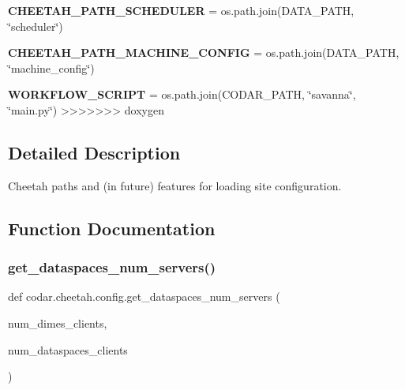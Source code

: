 \begin{DoxyCompactItemize}
{\bfseries C\+H\+E\+E\+T\+A\+H\+\_\+\+P\+A\+T\+H\+\_\+\+S\+C\+H\+E\+D\+U\+L\+ER} = os.\+path.\+join(D\+A\+T\+A\+\_\+\+P\+A\+TH, \char`\"{}scheduler\char`\"{})
\item 
\mbox{\label{namespacecodar_1_1cheetah_1_1config_a5d735d6f2f43c555f2e137b38af7fc94}} 
{\bfseries C\+H\+E\+E\+T\+A\+H\+\_\+\+P\+A\+T\+H\+\_\+\+M\+A\+C\+H\+I\+N\+E\+\_\+\+C\+O\+N\+F\+IG} = os.\+path.\+join(D\+A\+T\+A\+\_\+\+P\+A\+TH, \char`\"{}machine\+\_\+config\char`\"{})
\item 
\mbox{\label{namespacecodar_1_1cheetah_1_1config_a069e6b421b6b35917575637b5fe64409}} 
{\bfseries W\+O\+R\+K\+F\+L\+O\+W\+\_\+\+S\+C\+R\+I\+PT} = os.\+path.\+join(C\+O\+D\+A\+R\+\_\+\+P\+A\+TH, \char`\"{}savanna\char`\"{}, \char`\"{}main.\+py\char`\"{})
>>>>>>> doxygen
\end{DoxyCompactItemize}


\subsection{Detailed Description}
\begin{DoxyVerb}Cheetah paths and (in future) features for loading site configuration.
\end{DoxyVerb}
 

\subsection{Function Documentation}
\mbox{\label{namespacecodar_1_1cheetah_1_1config_a777b4339975017c9521b943afd76748d}} 
\subsubsection{\texorpdfstring{get\+\_\+dataspaces\+\_\+num\+\_\+servers()}{get\_dataspaces\_num\_servers()}}
{\footnotesize\ttfamily def codar.\+cheetah.\+config.\+get\+\_\+dataspaces\+\_\+num\+\_\+servers (\begin{DoxyParamCaption}\item[{}]{num\+\_\+dimes\+\_\+clients,  }\item[{}]{num\+\_\+dataspaces\+\_\+clients }\end{DoxyParamCaption})}

